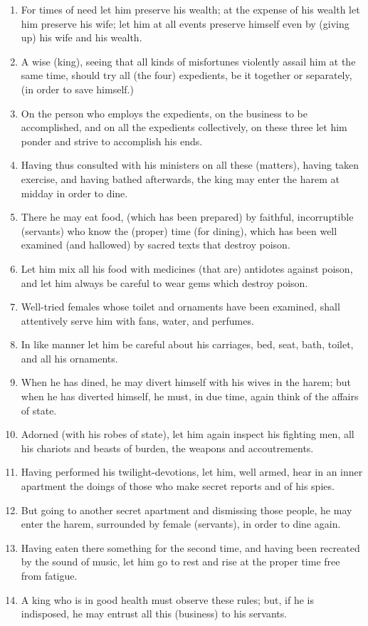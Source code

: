 \begin{enumerate}
\item For times of need let him preserve his wealth; at the expense of his wealth let him preserve his wife; let him at all events preserve himself even by (giving up) his wife and his wealth.
\item A wise (king), seeing that all kinds of misfortunes violently assail him at the same time, should try all (the four) expedients, be it together or separately, (in order to save himself.)
\item On the person who employs the expedients, on the business to be accomplished, and on all the expedients collectively, on these three let him ponder and strive to accomplish his ends.
\item Having thus consulted with his ministers on all these (matters), having taken exercise, and having bathed afterwards, the king may enter the harem at midday in order to dine.
\item There he may eat food, (which has been prepared) by faithful, incorruptible (servants) who know the (proper) time (for dining), which has been well examined (and hallowed) by sacred texts that destroy poison.
\item Let him mix all his food with medicines (that are) antidotes against poison, and let him always be careful to wear gems which destroy poison.
\item Well-tried females whose toilet and ornaments have been examined, shall attentively serve him with fans, water, and perfumes.
\item In like manner let him be careful about his carriages, bed, seat, bath, toilet, and all his ornaments.
\item When he has dined, he may divert himself with his wives in the harem; but when he has diverted himself, he must, in due time, again think of the affairs of state.
\item Adorned (with his robes of state), let him again inspect his fighting men, all his chariots and beasts of burden, the weapons and accoutrements.
\item Having performed his twilight-devotions, let him, well armed, hear in an inner apartment the doings of those who make secret reports and of his spies.
\item But going to another secret apartment and dismissing those people, he may enter the harem, surrounded by female (servants), in order to dine again.
\item Having eaten there something for the second time, and having been recreated by the sound of music, let him go to rest and rise at the proper time free from fatigue.
\item A king who is in good health must observe these rules; but, if he is indisposed, he may entrust all this (business) to his servants.
\end{enumerate}

